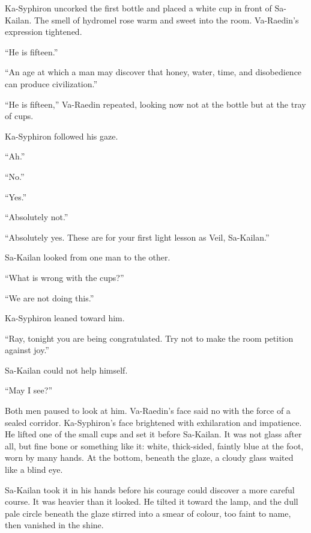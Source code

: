 Ka-Syphiron uncorked the first bottle and placed a white cup in front of Sa-Kailan.
The smell of hydromel rose warm and sweet into the room. Va-Raedin’s expression tightened.\par
“He is fifteen.”\par
“An age at which a man may discover that honey, water, time, and disobedience can produce civilization.”\par
“He is fifteen,” Va-Raedin repeated, looking now not at the bottle but at the tray of cups.\par
Ka-Syphiron followed his gaze.\par
“Ah.”\par
“No.”\par
“Yes.”\par
“Absolutely not.”\par
“Absolutely yes. These are for your first light lesson as Veil, Sa-Kailan.”\par
Sa-Kailan looked from one man to the other.\par
“What is wrong with the cups?”\par
“We are not doing this.”\par
Ka-Syphiron leaned toward him.\par
“Ray, tonight you are being congratulated. Try not to make the room petition against joy.”\par
Sa-Kailan could not help himself.\par
“May I see?”\par


Both men paused to look at him. Va-Raedin’s face said no with the force of a sealed corridor.
Ka-Syphiron’s face brightened with exhilaration and impatience. He lifted one of the small cups and set it before Sa-Kailan.
It was not glass after all, but fine bone or something like it: white, thick-sided, faintly blue at the foot, worn by many hands. 
At the bottom, beneath the glaze, a cloudy glass waited like a blind eye.\par
Sa-Kailan took it in his hands before his courage could discover a more careful course. 
It was heavier than it looked. He tilted it toward the lamp, and the dull pale circle beneath the glaze stirred into a smear of colour, too faint to name, then vanished in the shine.\par


